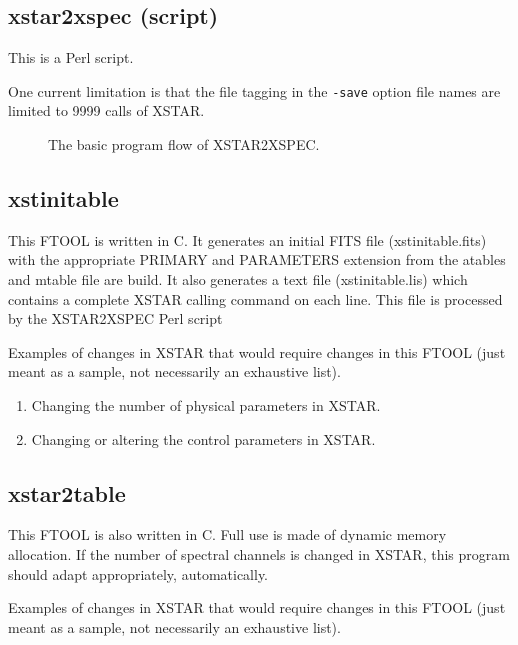 \subsection{xstar2xspec (script)}

This is a Perl script.

One current limitation is that the file tagging in the {\tt -save} 
option file names are limited to 9999 calls of XSTAR.

\begin{figure}
\epsfxsize=5.6in  %
\epsfysize=7.0in  %
\caption{The basic program flow of XSTAR2XSPEC.}
\label{fig:xstar2xspec}
\end{figure}

\subsection{xstinitable}

This FTOOL is written in C.  It generates an initial FITS file 
(xstinitable.fits) with 
the appropriate PRIMARY and PARAMETERS extension from the 
atables and mtable file are build.  It also generates a text file 
(xstinitable.lis) which contains a complete XSTAR calling command on 
each line.  This file is processed by the XSTAR2XSPEC Perl script

Examples of changes in XSTAR that would require changes in this FTOOL 
(just meant as a sample, not necessarily an exhaustive list).

\begin{enumerate}
	\item  Changing the number of physical parameters in XSTAR.

	\item  Changing or altering the control parameters in XSTAR.

\end{enumerate}

\subsection{xstar2table}

This FTOOL is also written in C.
Full use is made of dynamic memory allocation.  If the number of 
spectral channels is changed in XSTAR, this program should adapt 
appropriately, automatically.

Examples of changes in XSTAR that would require changes in this FTOOL 
(just meant as a sample, not necessarily an exhaustive list).

